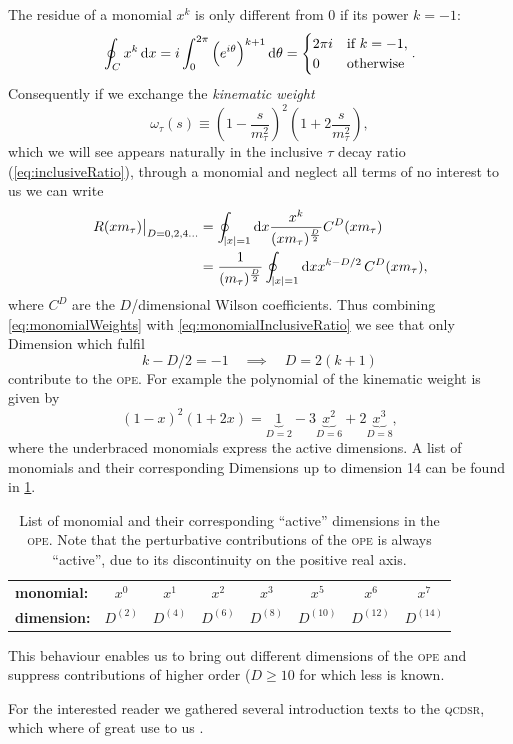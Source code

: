 \documentclass[../../index.tex]{subfiles}
\begin{document}
The residue of a monomial \(x^k\) is only different from 0 if its power
\(k=-1\):
\begin{equation}
  \label{eq:monomialWeights}
  \oint_{C} x^k \dif x = i \int_0^{2\pi}\left(e^{i \theta}\right)^{k+1} \dif \theta
  = \begin{cases} \mbox{$2 \pi i$} & \mbox{if } k=-1, \\ \mbox{0} & \mbox{otherwise} \end{cases}.
\end{equation}
Consequently if we exchange the \textit{kinematic weight}
\begin{equation}
  \label{eq:kinematicWeight}
  \omega_\tau(s) \equiv \left( 1-\frac{s}{m_\tau^2} \right)^2 \left( 1 + 2 \frac{s}{m_\tau^2} \right),
\end{equation}
which we will see appears naturally in the inclusive \(\tau\) decay ratio
(\cref{eq:inclusiveRatio}), through a monomial and neglect all terms of no
interest to us we can write
\begin{equation}
  \label{eq:monomialInclusiveRatio}
  \begin{split}
    \left. R(x m_\tau) \right\rvert_{D=0,2,4\dots} &= \oint_{\abs{x}=1} \dif x \frac{x^k}{(x m_\tau)^{\frac{D}{2}}}C^{D}(x m_\tau) \\
    &= \frac{1}{(m_\tau)^{\frac{D}{2}}} \oint_{\abs{x}=1} \dif x x^{k-D/2}
    \,C^{D}(x m_\tau),
  \end{split}
\end{equation}
where \(C^{D}\) are the \(D\)\-/dimensional Wilson coefficients. Thus combining
\cref{eq:monomialWeights} with \cref{eq:monomialInclusiveRatio} we see that only
Dimension which fulfil
\begin{equation}
  k - D/2 = -1 \quad \implies \quad  D = 2(k+1)
\end{equation}
contribute to the \textsc{ope}. For example the polynomial of the kinematic
weight is given by
\begin{equation}
  (1 - x)^2 (1 + 2x) = \underbrace{1}_{D=2} - 3\underbrace{x^2}_{D=6} + 2\underbrace{x^3}_{D=8},
\end{equation}
where the underbraced monomials express the active dimensions. A list of
monomials and their corresponding Dimensions up to dimension 14 can be found in
\cref{table:monomialDimensions}.
\begin{table}
  \centering
  \begin{tabular}{l|ccccccc}
    \toprule
    \textbf{monomial:} & $x^0$ & $x^1$ & $x^2$ & $x^3$ & $x^5$ & $x^6$ & $x^7$\\
    \textbf{dimension:} & $D^{(2)}$ & $D^{(4)}$ & $D^{(6)}$ & $D^{(8)}$ & $D^{(10)}$ & $D^{(12)}$ & $D^{(14)}$\\
    \bottomrule 
  \end{tabular}
  \caption{List of monomial and their corresponding ``active'' dimensions in the
    \textsc{ope}. Note that the perturbative contributions of the \textsc{ope}
    is always ``active'', due to its discontinuity on the positive real axis.}
  \label{table:monomialDimensions}
\end{table}
This behaviour enables us to bring out different dimensions of the \textsc{ope}
and suppress contributions of higher order (\(D\geq10\) for which less is known.


For the interested reader we gathered several introduction texts to the
\textsc{qcdsr}, which where of great use to us
\cite{Narison1989,Rafael1997,Colangelo2000,Dominguez2013}.
\end{document}
